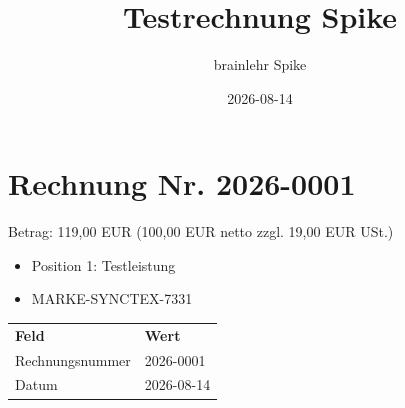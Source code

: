 \documentclass{article}
\title{Testrechnung Spike}
\author{brainlehr Spike}
\date{2026-08-14}
\begin{document}

\section{Rechnung Nr. 2026-0001}

\noindent Betrag: 119,00 EUR (100,00 EUR netto zzgl. 19,00 EUR USt.)

\begin{itemize}
  \item Position 1: Testleistung
  \item MARKE-SYNCTEX-7331
\end{itemize}

\begin{tabular}{ll}
  \textbf{Feld} & \textbf{Wert} \\
  Rechnungsnummer & 2026-0001 \\
  Datum & 2026-08-14 \\
\end{tabular}
\end{document}
